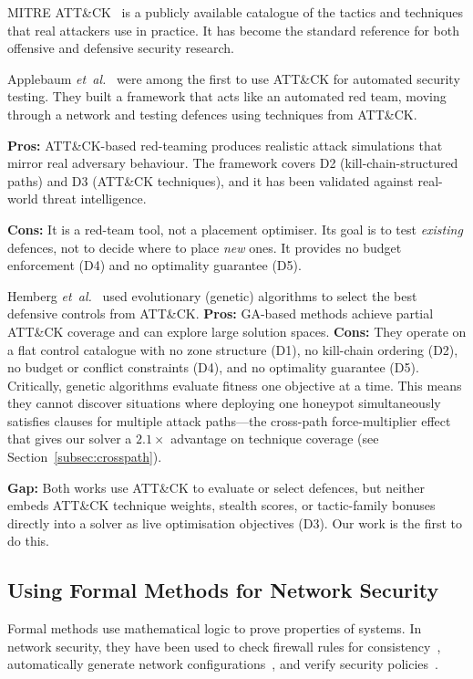 \documentclass[journal]{IEEEtran}
\newcommand{\etal}{\emph{et~al.}}
\begin{document}
MITRE ATT\&CK~\cite{mitre2023} is a publicly available
catalogue of the tactics and techniques that real attackers
use in practice.
It has become the standard reference for both offensive and
defensive security research.

Applebaum \etal{}~\cite{applebaum2016} were among the first
to use ATT\&CK for automated security testing.
They built a framework that acts like an automated red team,
moving through a network and testing defences using
techniques from ATT\&CK.

\textbf{Pros:} ATT\&CK-based red-teaming produces realistic
attack simulations that mirror real adversary behaviour.
The framework covers D2 (kill-chain-structured paths) and
D3 (ATT\&CK techniques), and it has been validated against
real-world threat intelligence.

\textbf{Cons:} It is a red-team tool, not a placement
optimiser.
Its goal is to test \emph{existing} defences, not to decide
where to place \emph{new} ones.
It provides no budget enforcement (D4) and no optimality
guarantee (D5).

Hemberg \etal{}~\cite{hemberg2020} used evolutionary
(genetic) algorithms to select the best defensive controls
from ATT\&CK.
\textbf{Pros:} GA-based methods achieve partial ATT\&CK
coverage and can explore large solution spaces.
\textbf{Cons:} They operate on a flat control catalogue
with no zone structure (D1), no kill-chain ordering (D2),
no budget or conflict constraints (D4), and no optimality
guarantee (D5).
Critically, genetic algorithms evaluate fitness one objective
at a time.
This means they cannot discover situations where deploying
one honeypot simultaneously satisfies clauses for multiple
attack paths---the cross-path force-multiplier effect that
gives our solver a $2.1\times$ advantage on technique
coverage (see Section~\ref{subsec:crosspath}).

\textbf{Gap:} Both works use ATT\&CK to evaluate or select
defences, but neither embeds ATT\&CK technique weights,
stealth scores, or tactic-family bonuses directly into a
solver as live optimisation objectives (D3).
Our work is the first to do this.

\subsection{Using Formal Methods for Network Security}

Formal methods use mathematical logic to prove properties of
systems.
In network security, they have been used to check firewall
rules for consistency~\cite{al2011}, automatically generate
network configurations~\cite{jeffrey2009}, and verify
security policies~\cite{fisler2005}.
\end{document}
